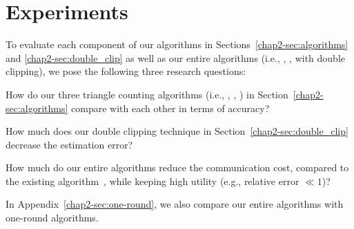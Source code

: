 \section{Experiments}
\label{chap2-sec:experiments}

To evaluate each component of our algorithms in Sections~\ref{chap2-sec:algorithms} and \ref{chap2-sec:double_clip} as well as our entire algorithms (i.e., \AlgOne, \AlgTwo, \AlgThree with double clipping), we pose the following three research questions:
\begin{description}[leftmargin=9.75mm]
    \item[RQ1.] 
    How do our three triangle counting algorithms 
    (i.e., \AlgOne, \AlgTwo, \AlgThree) in Section~\ref{chap2-sec:algorithms} compare with each other in terms of accuracy?
    \item[RQ2.] 
    How much does our double clipping technique in Section~\ref{chap2-sec:double_clip} decrease the estimation error?
    \item[RQ3.] 
    How much do our entire algorithms reduce the communication cost, compared to the existing algorithm~\cite{Imola_USENIX21}, while keeping high utility (e.g., relative error $\ll 1$)?
\end{description}
In Appendix~\ref{chap2-sec:one-round}, we also compare our entire algorithms with one-round algorithms.



